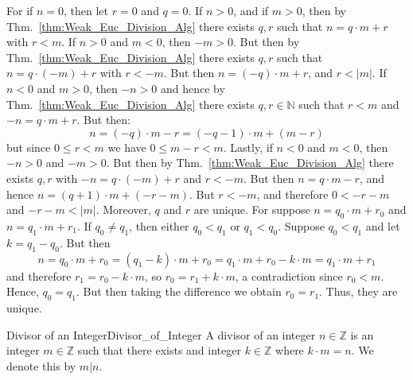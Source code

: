 \documentclass{article}                                                        %
\begin{document}
            \begin{bproof}
                For if $n=0$, then let $r=0$ and $q=0$. If $n>0$, and if $m>0$,
                then by Thm.~\ref{thm:Weak_Euc_Division_Alg} there exists
                $q,r$ such that $n=q\cdot{m}+r$ with $r<m$. If $n>0$ and $m<0$,
                then $\minus{m}>0$. But then by
                Thm.~\ref{thm:Weak_Euc_Division_Alg} there exists $q,r$ such
                that $n=q\cdot(\minus{m})+r$ with $r<\minus{m}$. But then
                $n=(\minus{q})\cdot{m}+r$, and $r<|m|$. If $n<0$ and $m>0$,
                then $\minus{n}>0$ and hence by
                Thm.~\ref{thm:Weak_Euc_Division_Alg} there exists
                $q,r\in\mathbb{N}$ such that $r<m$ and $\minus{n}=q\cdot{m}+r$.
                But then:
                \begin{equation}
                    n=(\minus{q})\cdot{m}-r=(\minus{q}-1)\cdot{m}+(m-r)
                \end{equation}
                but since $0\leq{r}<m$ we have $0\leq{m}-r<m$. Lastly, if $n<0$
                and $m<0$, then $\minus{n}>0$ and $\minus{m}>0$. But then by
                Thm.~\ref{thm:Weak_Euc_Division_Alg} there exists $q,r$ with
                $\minus{n}=q\cdot(\minus{m})+r$ and $r<\minus{m}$. But then
                $n=q\cdot{m}-r$, and hence $n=(q+1)\cdot{m}+(\minus{r}-m)$. But 
                $r<\minus{m}$, and therefore $0<\minus{r}-m$ and
                $\minus{r}-m<|m|$. Moreover, $q$ and $r$ are unique. For suppose
                $n=q_{0}\cdot{m}+r_{0}$ and $n=q_{1}\cdot{m}+r_{1}$. If
                $q_{0}\ne{q}_{1}$, then either $q_{0}<q_{1}$ or $q_{1}<q_{0}$.
                Suppose $q_{0}<q_{1}$ and let $k=q_{1}-q_{0}$. But then
                \begin{equation}
                    n=q_{0}\cdot{m}+r_{0}=(q_{1}-k)\cdot{m}+r_{0}
                        =q_{1}\cdot{m}+r_{0}-k\cdot{m}
                        =q_{1}\cdot{m}+r_{1}
                \end{equation}
                and therefore $r_{1}=r_{0}-k\cdot{m}$, so
                $r_{0}=r_{1}+k\cdot{m}$, a contradiction since $r_{0}<m$. Hence,
                $q_{0}=q_{1}$. But then taking the difference we obtain
                $r_{0}=r_{1}$. Thus, they are unique.
            \end{bproof}
            \begin{fdefinition}{Divisor of an Integer}{Divisor_of_Integer}
                A divisor of an integer $n\in\mathbb{Z}$ is an integer
                $m\in\mathbb{Z}$ such that there exists and integer
                $k\in\mathbb{Z}$ where $k\cdot{m}=n$. We denote this by $m|n$.
            \end{fdefinition}
\end{document}
